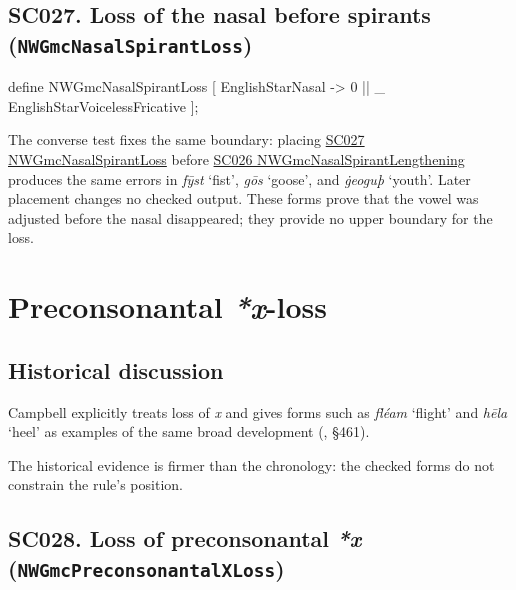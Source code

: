 \documentclass[
  british,
  a4paper,
  openany]{book}
\providecommand{\texorpdfstring}[2]{#1}
\begin{document}
\subsection{\texorpdfstring{SC027. Loss of the nasal before spirants
(\texttt{NWGmcNasalSpirantLoss})}{SC027. Loss of the nasal before spirants (NWGmcNasalSpirantLoss)}}\label{rule-NWGmcNasalSpirantLoss}

\begin{ReaderFacingFoma}
define NWGmcNasalSpirantLoss [
    EnglishStarNasal -> 0 || _ EnglishStarVoicelessFricative
];
\end{ReaderFacingFoma}

The converse test fixes the same boundary: placing
\hyperref[rule-NWGmcNasalSpirantLoss]{SC027 NWGmcNasalSpirantLoss}
before \hyperref[rule-NWGmcNasalSpirantLengthening]{SC026
NWGmcNasalSpirantLengthening} produces the same errors in \emph{fȳst}
`fist', \emph{gōs} `goose', and \emph{ġeoguþ} `youth'. Later placement
changes no checked output. These forms prove that the vowel was adjusted
before the nasal disappeared; they provide no upper boundary for the
loss.

\newpage

\section{\texorpdfstring{Preconsonantal
\emph{*x}-loss}{Preconsonantal -loss}}\label{preconsonantal--loss}

\subsection{Historical discussion}\label{historical-discussion-19}

Campbell explicitly treats loss of \emph{x} and gives forms such as
\emph{fléam} `flight' and \emph{hēla} `heel' as examples of the same
broad development (,
§461).

The historical evidence is firmer than the chronology: the checked forms
do not constrain the rule's position.

\subsection{\texorpdfstring{SC028. Loss of preconsonantal \emph{*x}
(\texttt{NWGmcPreconsonantalXLoss})}{SC028. Loss of preconsonantal  (NWGmcPreconsonantalXLoss)}}\label{rule-NWGmcPreconsonantalXLoss}
\end{document}
